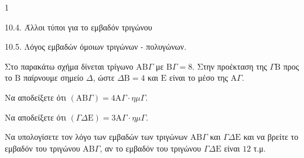 \begin{ylh}{1}
    \item 10.4. Άλλοι τύποι για το εμβαδόν τριγώνου
    \item 10.5. Λόγος εμβαδών όμοιων τριγώνων - πολυγώνων.
\end{ylh}
\begin{figure}
    \centering
\end{figure}
Στο παρακάτω σχήμα δίνεται τρίγωνο $\mathrm{AB}\Gamma$ με $\mathrm{B}\Gamma = 8$. Στην προέκταση της $\Gamma\mathrm{B}$ προς το $\mathrm{B}$ παίρνουμε σημείο $\Delta$, ώστε $\Delta\mathrm{B} = 4$ και $\mathrm{E}$ είναι το μέσο της $\mathrm{A}\Gamma$.
\begin{alist}
\item Να αποδείξετε ότι $(\mathrm{AB}\Gamma) = 4\mathrm{A}\Gamma \cdot \eta\mu\Gamma$. 
\item Να αποδείξετε ότι $(\Gamma\Delta\mathrm{E}) = 3\mathrm{A}\Gamma \cdot \eta\mu\Gamma$. 
\item Να υπολογίσετε τον λόγο των εμβαδών των τριγώνων $\mathrm{AB}\Gamma$ και $\Gamma\Delta\mathrm{E}$ και να βρείτε το εμβαδόν του τριγώνου $\mathrm{AB}\Gamma$, αν το εμβαδόν του τριγώνου $\Gamma\Delta\mathrm{E}$ είναι $12$ τ.μ. 
\end{alist}